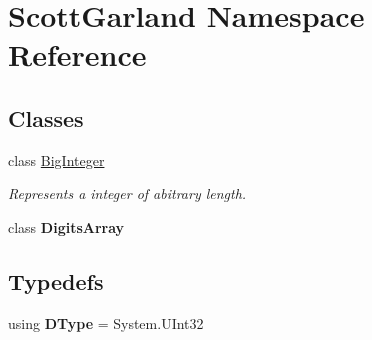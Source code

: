 \hypertarget{namespace_scott_garland}{}\section{Scott\+Garland Namespace Reference}
\label{namespace_scott_garland}
\subsection*{Classes}
\begin{DoxyCompactItemize}
\item 
class \hyperlink{class_scott_garland_1_1_big_integer}{Big\+Integer}
\begin{DoxyCompactList}\small\item\em Represents a integer of abitrary length. \end{DoxyCompactList}\item 
class {\bfseries Digits\+Array}
\end{DoxyCompactItemize}
\subsection*{Typedefs}
\begin{DoxyCompactItemize}
\item 
\mbox{\label{namespace_scott_garland_a01903e22d26e53455427d1290b6c9093}} 
using {\bfseries D\+Type} = System.\+U\+Int32
\end{DoxyCompactItemize}
